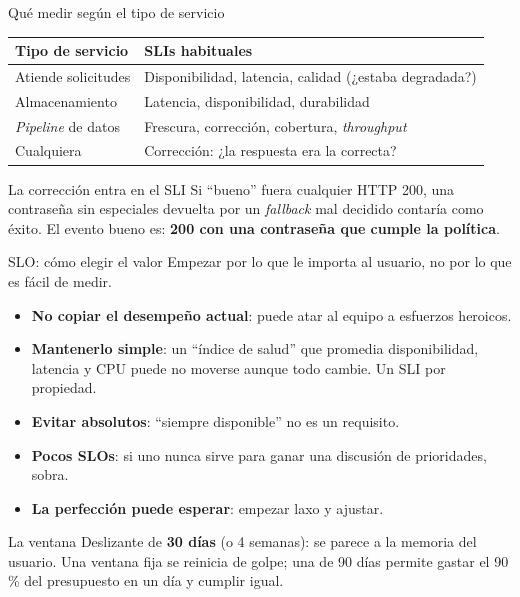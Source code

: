 \documentclass[institutional,screen,none]{ua-engineering-v6-beamer}
\begin{document}
\begin{frame}{Qué medir según el tipo de servicio}
\begin{center}
\small
\begin{tabular}{p{}p{}}
\toprule
\textbf{Tipo de servicio} & \textbf{SLIs habituales} \\
\midrule
Atiende solicitudes & Disponibilidad, latencia, calidad (¿estaba degradada?) \\
Almacenamiento & Latencia, disponibilidad, durabilidad \\
\emph{Pipeline} de datos & Frescura, corrección, cobertura, \emph{throughput} \\
Cualquiera & Corrección: ¿la respuesta era la correcta? \\
\bottomrule
\end{tabular}
\end{center}

\pause

\begin{alertblock}{La corrección entra en el SLI}
Si ``bueno'' fuera cualquier HTTP 200, una contraseña sin especiales devuelta por un \emph{fallback} mal decidido contaría como éxito. El evento bueno es: \textbf{200 con una contraseña que cumple la política}.
\end{alertblock}
\end{frame}

\begin{frame}{SLO: cómo elegir el valor}
Empezar por lo que le importa al usuario, no por lo que es fácil de medir.

\pause

\begin{itemize}\small
\item \textbf{No copiar el desempeño actual}: puede atar al equipo a esfuerzos heroicos.
\item \textbf{Mantenerlo simple}: un ``índice de salud'' que promedia disponibilidad, latencia y CPU puede no moverse aunque todo cambie. Un SLI por propiedad.
\item \textbf{Evitar absolutos}: ``siempre disponible'' no es un requisito.
\item \textbf{Pocos SLOs}: si uno nunca sirve para ganar una discusión de prioridades, sobra.
\item \textbf{La perfección puede esperar}: empezar laxo y ajustar.
\end{itemize}

\pause

\begin{block}{La ventana}
Deslizante de \textbf{30 días} (o 4 semanas): se parece a la memoria del usuario. Una ventana fija se reinicia de golpe; una de 90 días permite gastar el 90\,\% del presupuesto en un día y cumplir igual.
\end{block}
\end{frame}
\end{document}
